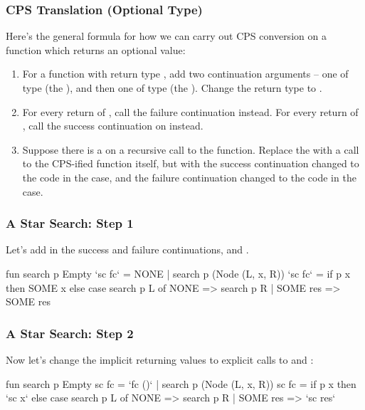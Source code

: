 \documentclass[aspectratio=169, handout]{beamer}
\begin{document}
\begin{frame}[fragile]
  \frametitle{CPS Translation (Optional Type)}

  Here's the general formula for how we can carry out CPS conversion on a function
  which returns an optional value:

  \pause
  \begin{enumerate}
    \item For a function with return type , add two continuation 
    arguments -- one of type  (the ), 
    and then one of type  (the ). 
    Change the return type to . \pause
    \item For every return of , call the failure continuation instead.
    For every return of , call the success continuation on 
    instead. \pause 
    \item Suppose there is a  on a recursive call to the function. 
    Replace the  with a call to the CPS-ified function itself, but 
    with the success continuation changed to the code in the  case, 
    and the failure continuation changed to the code in the  case. 
  \end{enumerate}
\end{frame}

\begin{frame}[fragile]
  \frametitle{A Star Search: Step 1}

  Let's add in the success and failure continuations,  and .

  \pause
  \vspace{\fill}
  
  \begin{codeblock}
    fun search p Empty `sc fc` = NONE
      | search p (Node (L, x, R)) `sc fc` =
          if p x then
            SOME x 
          else
            case search p L of
              NONE => search p R
            | SOME res => SOME res
  \end{codeblock}
\end{frame}

\begin{frame}[fragile]
  \frametitle{A Star Search: Step 2}

  Now let's change the implicit returning values to explicit calls to
   and : 

  \pause
  \vspace{\fill}
  
  \begin{codeblock}
    fun search p Empty sc fc = `fc ()`
      | search p (Node (L, x, R)) sc fc =
          if p x then
            `sc x` 
          else
            case search p L of
              NONE => search p R
            | SOME res => `sc res`
  \end{codeblock}
\end{frame}
\end{document}
